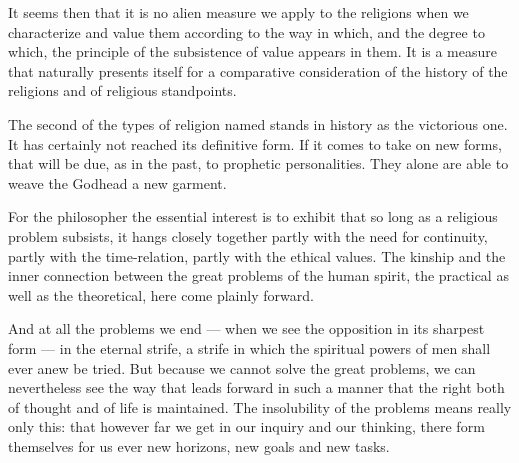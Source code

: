 \documentclass[12pt,a4paper]{book}
\newcommand{\opage}[1]{\marginnote{\footnotesize\textit{[#1]}}}
\begin{document}
It seems then that it is no alien measure we apply to the religions when we
characterize and value them according to the way in which, and the degree to
which, the principle of the subsistence of value appears in them. It is a measure
that naturally presents itself for a comparative consideration of the history of
the religions and of religious standpoints.

The second of the types of religion named stands in history \opage{84}as the victorious
one. It has certainly not reached its definitive form. If it comes to take on new
forms, that will be due, as in the past, to prophetic personalities. They alone
are able to weave the Godhead a new garment.

For the philosopher the essential interest is to exhibit that so long as a
religious problem subsists, it hangs closely together partly with the need for
continuity, partly with the time-relation, partly with the ethical values. The
kinship and the inner connection between the great problems of the human spirit,
the practical as well as the theoretical, here come plainly forward.

And at all the problems we end --- when we see the opposition in its sharpest
form --- in the eternal strife, a strife in which the spiritual powers of men
shall ever anew be tried. But because we cannot solve the great problems, we can
nevertheless see the way that leads forward in such a manner that the right both
of thought and of life is maintained. The insolubility of the problems means
really only this: that however far we get in our inquiry and our thinking, there
form themselves for us ever new horizons, new goals and new tasks.
\end{document}
